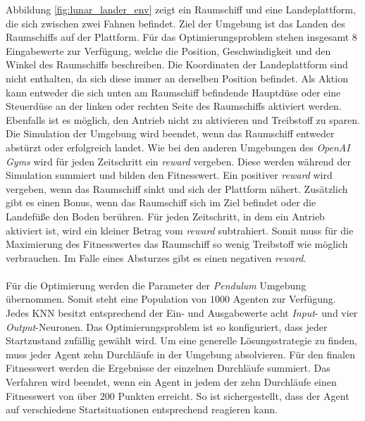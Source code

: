 Abbildung \ref{fig:lunar_lander_env} zeigt ein Raumschiff und eine Landeplattform, die sich zwischen zwei Fahnen befindet. Ziel der Umgebung ist das Landen des Raumschiffs auf der Plattform. Für das Optimierungsproblem stehen insgesamt $8$ Eingabewerte zur Verfügung, welche die Position, Geschwindigkeit und den Winkel des Raumschiffs beschreiben. Die Koordinaten der Landeplattform sind nicht enthalten, da sich diese immer an derselben Position befindet. Als Aktion kann entweder die sich unten am Raumschiff befindende Hauptdüse oder eine Steuerdüse an der linken oder rechten Seite des Raumschiffs aktiviert werden. Ebenfalls ist es möglich, den Antrieb nicht zu aktivieren und Treibstoff zu sparen. Die Simulation der Umgebung wird beendet, wenn das Raumschiff entweder abstürzt oder erfolgreich landet. Wie bei den anderen Umgebungen des \emph{OpenAI Gyms} wird für jeden Zeitschritt ein \emph{reward} vergeben. Diese werden während der Simulation summiert und bilden den Fitnesswert. Ein positiver \emph{reward} wird vergeben, wenn das Raumschiff sinkt und sich der Plattform nähert. Zusätzlich gibt es einen Bonus, wenn das Raumschiff sich im Ziel befindet oder die Landefüße den Boden berühren. Für jeden Zeitschritt, in dem ein Antrieb aktiviert ist, wird ein kleiner Betrag vom \emph{reward} subtrahiert. Somit muss für die Maximierung des Fitnesswertes das Raumschiff so wenig Treibstoff wie möglich verbrauchen. Im Falle eines Absturzes gibt es einen negativen \emph{reward}.
\\\\
Für die Optimierung werden die Parameter der \emph{Pendulum} Umgebung übernommen. Somit steht eine Population von $1000$ Agenten zur Verfügung. Jedes \ac{KNN} besitzt entsprechend der Ein- und Ausgabewerte acht \emph{Input}- und vier \emph{Output}-Neuronen. Das Optimierungsproblem ist so konfiguriert, dass jeder Startzustand zufällig gewählt wird. Um eine generelle Lösungsstrategie zu finden, muss jeder Agent zehn Durchläufe in der Umgebung absolvieren. Für den finalen Fitnesswert werden die Ergebnisse der einzelnen Durchläufe summiert. Das Verfahren wird beendet, wenn ein Agent in jedem der zehn Durchläufe einen Fitnesswert von über $200$ Punkten erreicht. So ist sichergestellt, dass der Agent auf verschiedene Startsituationen entsprechend reagieren kann.
